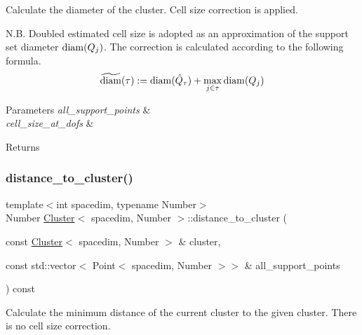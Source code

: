 Calculate the diameter of the cluster. Cell size correction is applied.

N.\+B. Doubled estimated cell size is adopted as an approximation of the support set diameter ${\rm diam}(Q_j)$. The correction is calculated according to the following formula. \[ \widetilde{\rm diam}(\tau) := {\rm diam}(\hat{Q}_{\tau}) + \max_{j \in \tau} {\rm diam}(Q_j) \] 
\begin{DoxyParams}{Parameters}
{\em all\+\_\+support\+\_\+points} & \\
\hline
{\em cell\+\_\+size\+\_\+at\+\_\+dofs} & \\
\hline
\end{DoxyParams}
\begin{DoxyReturn}{Returns}

\end{DoxyReturn}
\mbox{\label{classCluster_aba84e3743344f360ccdb855037e1b45e}} 
\subsubsection{\texorpdfstring{distance\+\_\+to\+\_\+cluster()}{distance\_to\_cluster()}\hspace{0.1cm}{\footnotesize\ttfamily [1/2]}}
{\footnotesize\ttfamily template$<$int spacedim, typename Number$>$ \\
Number \hyperlink{classCluster}{Cluster}$<$ spacedim, Number $>$\+::distance\+\_\+to\+\_\+cluster (\begin{DoxyParamCaption}\item[{const \hyperlink{classCluster}{Cluster}$<$ spacedim, Number $>$ \&}]{cluster,  }\item[{const std\+::vector$<$ Point$<$ spacedim, Number $>$$>$ \&}]{all\+\_\+support\+\_\+points }\end{DoxyParamCaption}) const}

Calculate the minimum distance of the current cluster to the given cluster. There is no cell size correction. \mbox{\label{classCluster_a1eeffaea84b84d0288544dd4ff007d7b}} 

